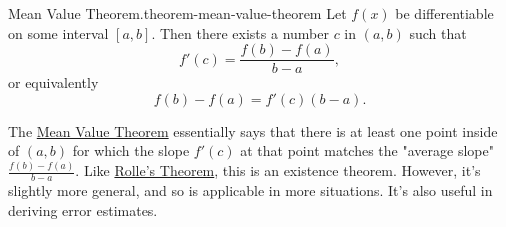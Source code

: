 \documentclass[10pt,]{book}
\numberwithin{equation}{section}
\begin{document}
\begin{theorem}{Mean Value Theorem.}{}{theorem-mean-value-theorem}%
\hypertarget{p-338}{}%
Let \(f(x)\) be differentiable on some interval \([a,b]\). Then there exists a number \(c\) in \((a,b)\) such that%
\begin{equation*}
f'(c) = \frac{f(b) - f(a)}{b-a},
\end{equation*}
or equivalently%
\begin{equation*}
f(b) - f(a) = f'(c)(b-a).
\end{equation*}
%
\end{theorem}
\hypertarget{p-339}{}%
The \hyperref[theorem-mean-value-theorem]{Mean Value Theorem} essentially says that there is at least one point inside of \((a,b)\) for which the slope \(f'(c)\) at that point matches the "average slope" \(\frac{f(b) - f(a)}{b-a}.\) Like \hyperref[theorem-rolle-s-theorem]{Rolle's Theorem}, this is an existence theorem. However, it's slightly more general, and so is applicable in more situations. It's also useful in deriving error estimates.%
\end{document}
